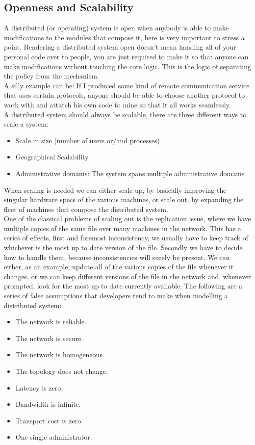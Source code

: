 \subsection{Openness and Scalability}
A distributed (or operating) system is open when anybody is able to make modifications to the modules that compose it, here is very important to stress a point. Rendering a distributed system open doesn't mean handing all of your personal code over to people, you are just required to make it so that anyone can make modifications without touching the core logic. This is the logic of separating the policy from the mechanism. \\
A silly example can be: If I produced some kind of remote communication service that uses certain protocols, anyone should be able to choose another protocol to work with and attatch his own code to mine so that it all works seamlessly. \\
A distributed system should always be scalable, there are three different ways to scale a system:
\begin{itemize}
    \item Scale in size (number of users or/and processes)
    \item Geographical Scalability
    \item Administrative domanis: The system spans multiple administrative domains
\end{itemize}
When scaling is needed we can either scale up, by basically improving the singular hardware specs of the various machines, or scale out, by expanding the fleet of machines that compose the distributed system. \\
One of the classical problems of scaling out is the replication issue, where we have multiple copies of the same file over many machines in the network. This has a series of effects, first and foremost inconsistency, we usually have to keep track of whichever is the most up to date version of the file. Secondly we have to decide how to handle them, because inconsistencies will surely be present. We can either, as an example, update all of the various copies of the file whenever it changes, or we can keep different versions of the file in the network and, whenever prompted, look for the most up to date currently available.
\subDistance
The following are a series of false assumptions that developers tend to make when modelling a distributed system:
\begin{itemize}
    \item The network is reliable.
    \item The network is secure.
    \item The network is homogeneous.
    \item The topology does not change.
    \item Latency is zero.
    \item Bandwidth is infinite.
    \item Transport cost is zero.
    \item One single administrator.
\end{itemize}
